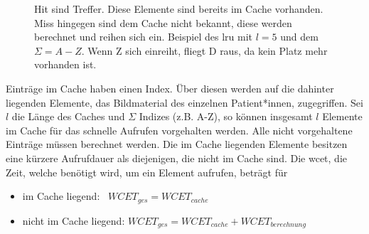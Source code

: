 \begin{figure}[b]\centering
{}
\caption[Beispiel des \ac{lru}]{Hit sind Treffer. Diese Elemente sind bereits im Cache vorhanden. Miss hingegen sind dem Cache nicht bekannt, diese werden berechnet und reihen sich ein. Beispiel des \ac{lru} mit $l=5$ und dem $\Sigma=A-Z$. Wenn Z sich einreiht, fliegt D raus, da kein Platz mehr vorhanden ist.}\label{cap:lrucache}
\end{figure}\label{fig:lrucache}

Einträge im Cache haben einen Index. Über diesen werden auf die dahinter liegenden Elemente, das Bildmaterial des einzelnen Patient*innen, zugegriffen. Sei $l$ die Länge des Caches und $\Sigma$ Indizes (z.B. A-Z), so können insgesamt $l$ Elemente im Cache für das schnelle Aufrufen vorgehalten werden. Alle nicht vorgehaltene Einträge müssen berechnet werden. Die im Cache liegenden Elemente besitzen eine kürzere Aufrufdauer als diejenigen, die nicht im Cache sind. Die \ac{wcet}, die Zeit, welche benötigt wird, um ein Element aufrufen, beträgt für

\begin{itemize}
  \setlength\itemsep{-0.5em}
\item im Cache liegend: \qquad\, $WCET_{ges}=WCET_{cache}$
\item nicht im Cache liegend: $WCET_{ges}=WCET_{cache} + WCET_{berechnung}$
\end{itemize}

